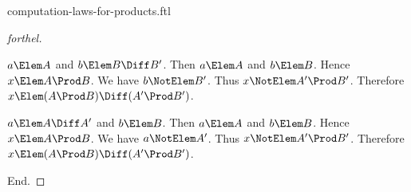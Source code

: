 \documentclass{stex}
\begin{document}
\begin{smodule}{computation-laws-for-products.ftl}
\begin{proof}[forthel]
    \begin{case}{$a \Elem A$ and $b \Elem B \Diff B'$.}
      Then $a \Elem A$ and $b \Elem B$.
      Hence $x \Elem A \Prod B$.
      We have $b \NotElem B'$.
      Thus $x \NotElem A' \Prod B'$.
      Therefore $x \Elem (A \Prod B) \Diff (A' \Prod B')$.
    \end{case}

    \begin{case}{$a \Elem A \Diff A'$ and $b \Elem B$.}
      Then $a \Elem A$ and $b \Elem B$.
      Hence $x \Elem A \Prod B$.
      We have $a \NotElem A'$.
      Thus $x \NotElem A' \Prod B'$.
      Therefore $x \Elem (A \Prod B) \Diff (A' \Prod B')$.
    \end{case}
  End.
\end{proof}

\end{smodule}
\end{document}
